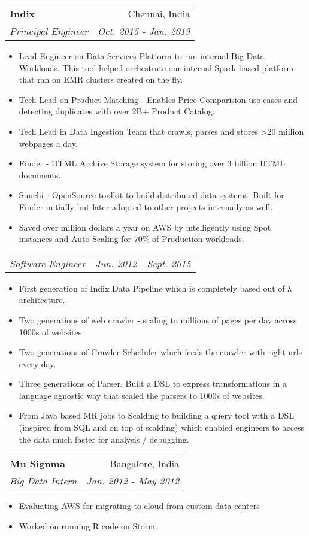 \documentclass[letterpaper,11pt]{article}
\makeatletter
\newcommand{\resumeItemWithoutTitle}[1]{
  \item\small{
    {#1 \vspace{-2pt}}
  }
}
\newcommand{\resumeSubheading}[4]{
  \vspace{-1pt}\item
    \begin{tabular*}{0.97\textwidth}[t]{l@{\extracolsep{\fill}}r}
      \textbf{#1} & #2 \\
      \textit{\small#3} & \textit{\small #4} \\
    \end{tabular*}\vspace{-5pt}
}
\newcommand{\resumeSubSubheading}[2]{
    \begin{tabular*}{0.97\textwidth}{l@{\extracolsep{\fill}}r}
      \textit{\small#1} & \textit{\small #2} \\
    \end{tabular*}\vspace{-5pt}
}
\newcommand{\resumeItemListStart}{\begin{itemize}}
\newcommand{\resumeItemListEnd}{\end{itemize}\vspace{-5pt}}
\makeatother
\begin{document}
    \resumeSubheading
      {Indix}{Chennai, India}
      {Principal Engineer}{Oct. 2015 - Jan. 2019}
      \resumeItemListStart
        \resumeItemWithoutTitle
          {Lead Engineer on Data Services Platform to run internal Big Data Workloads. This tool helped orchestrate our internal Spark based platform that ran on EMR clusters created on the fly.}
        \resumeItemWithoutTitle
          {Tech Lead on Product Matching - Enables Price Comparision use-cases and detecting duplicates with over 2B+ Product Catalog. }
        \resumeItemWithoutTitle
          {Tech Lead in Data Ingestion Team that crawls, parses and stores >20 million webpages a day.}
        \resumeItemWithoutTitle
          {Finder - HTML Archive Storage system for storing over 3 billion HTML documents.}
        \resumeItemWithoutTitle
          {\href{https://github.com/ashwanthkumar/suuchi}{Suuchi} - OpenSource toolkit to build distributed data systems. Built for Finder initially but later adopted to other projects internally as well.}
        \resumeItemWithoutTitle
          {Saved over million dollars a year on AWS by intelligently using Spot instances and Auto Scaling for 70\% of Production workloads.}
      \resumeItemListEnd

    \resumeSubSubheading
      {Software Engineer}{Jun. 2012 - Sept. 2015}
      \resumeItemListStart
        \resumeItemWithoutTitle
          {First generation of Indix Data Pipeline which is completely based out of λ architecture.}
        \resumeItemWithoutTitle
          {Two generations of web crawler - scaling to millions of pages per day across 1000s of websites.}
        \resumeItemWithoutTitle
          {Two generations of Crawler Scheduler which feeds the crawler with right urls every day.}
        \resumeItemWithoutTitle
          {Three generations of Parser. Built a DSL to express transformations in a language agnostic way that scaled the parsers to 1000s of websites.}
        \resumeItemWithoutTitle
          {From Java based MR jobs to Scalding to building a query tool with a DSL (inspired from SQL and on top of scalding) which enabled engineers
          to access the data much faster for analysis / debugging.}
      \resumeItemListEnd

    \resumeSubheading
      {Mu Signma}{Bangalore, India}
      {Big Data Intern}{Jan. 2012 - May 2012}
      \resumeItemListStart
        \resumeItemWithoutTitle
          {Evaluating AWS for migrating to cloud from custom data centers}
        \resumeItemWithoutTitle
          {Worked on running R code on Storm.}
      \resumeItemListEnd
\end{document}
